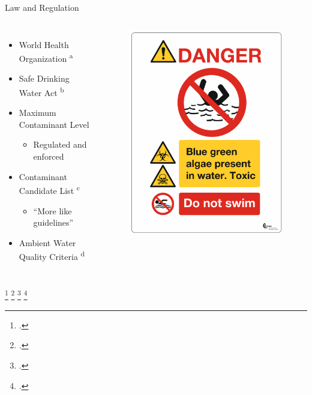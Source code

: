 \begin{frame}{Law and Regulation}
	\begin{columns}
	\begin{itemize}
		\item World Health Organization \textsuperscript{a}
		\item Safe Drinking Water Act \textsuperscript{b}  	
		\item Maximum Contaminant Level 
			\begin{itemize}
				\item Regulated and enforced
			\end{itemize}
		\item Contaminant Candidate List \textsuperscript{c} 
			\begin{itemize}
				\item ``More like guidelines''
			\end{itemize}
		\item Ambient Water Quality Criteria \textsuperscript{d}
	\end{itemize}

	\begin{figure}
		\centering
		\includegraphics[scale=0.3]{warning.PNG}
	\end{figure}
	
	\end{columns}
	\footcitetext{[a], http://www.who.int/water/dwq/chemicals/cyanobactoxins.pdf}
	\footcitetext{[b], noauthor_guidelines_1998}
	\footcitetext{[c], usepa_drinking_2016}
	\footcitetext{[d], https://www.epa.gov/sites/production/files/monitoringRec.pdf}
\end{frame}


